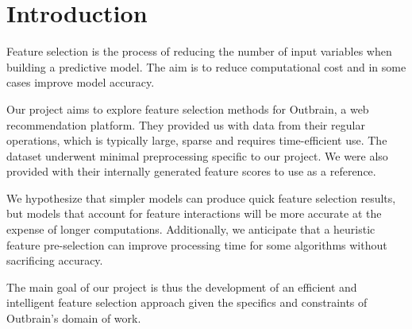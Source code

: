 \documentclass[fleqn,moreauthors,10pt]{ds_report}
\affiliation{\textit{Advisors: Jure Demšar, Blaž Mramor, Blaž Škrlj}}
\begin{document}
\flushbottom 

\maketitle
\thispagestyle{empty}


\section*{Introduction}

Feature selection is the process of reducing the number of input variables when building a predictive model. The aim is to reduce computational cost and in some cases improve model accuracy.

Our project aims to explore feature selection methods for Outbrain, a web recommendation platform. They provided us with data from their regular operations, which is typically large, sparse and requires time-efficient use. The dataset underwent minimal preprocessing specific to our project. We were also provided with their internally generated feature scores to use as a reference.

We hypothesize that simpler models can produce quick feature selection results, but models that account for feature interactions will be more accurate at the expense of longer computations. Additionally, we anticipate that a heuristic feature pre-selection can improve processing time for some algorithms without sacrificing accuracy. 

The main goal of our project is thus the development of an efficient and intelligent feature selection approach given the specifics and constraints of Outbrain's domain of work.

	
\end{document}
